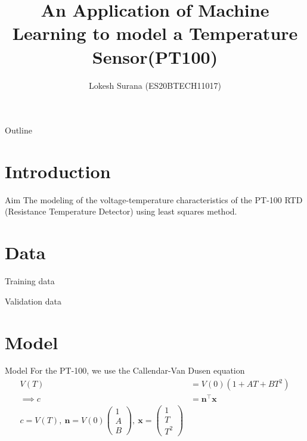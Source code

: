 \documentclass{beamer}
\title[PT-100 ]{An Application of Machine Learning to model a Temperature Sensor(PT100)}
\author{Lokesh Surana (ES20BTECH11017)}
\providecommand{\brak}[1]{\ensuremath{\left(#1\right)}}
\theoremstyle{remark}
\newcommand{\myvec}[1]{\ensuremath{\begin{pmatrix}#1\end{pmatrix}}}
\renewcommand{\vec}[1]{\mathbf{\boldsymbol{#1}}}
\begin{document}
\begin{frame}
    \titlepage
\end{frame}

\begin{frame}{Outline}
    \tableofcontents
\end{frame}

\section{Introduction}
\begin{frame}{Aim}
    The modeling of the voltage-temperature characteristics of the PT-100 RTD (Resistance Temperature Detector) using least squares method.
\end{frame}

\section{Data}
\begin{frame}{Training data}
    \begin{table}[ht!]
        
        \caption{Training data}
        \label{tab:Training data}
    \end{table}
\end{frame}

\begin{frame}{Validation data}
    \begin{table}[!ht]
        \centering
        
        \caption{Validation data}
        \label{tab:Validation data}
    \end{table}
\end{frame}

\section{Model}
\begin{frame}{Model}
    For the PT-100, we use the Callendar-Van Dusen equation
    \begin{align}
        V(T)       & = V(0)\brak{1+AT+BT^2} \\
        \implies c & = \vec{n}^\top\vec{x}  \\
        c = V(T),\ \vec{n} = V(0)\myvec{1   \\A\\B},\ \vec{x} = \myvec{1\\T\\T^2}
    \end{align}
\end{frame}
\end{document}
